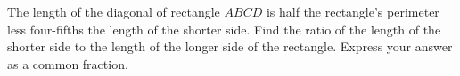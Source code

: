 The length of the diagonal of rectangle $ABCD$ is half the rectangle's perimeter less four-fifths the length of the shorter side. Find the ratio of the length of the shorter side to the length of the longer side of the rectangle. Express your answer as a common fraction.

